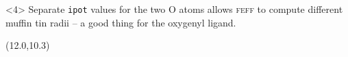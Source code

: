 \documentclass[10pt, xcolor=x11names, compress]{beamer}
\begin{document}
\begin{frame}[fragile]
\begin{columns}[T]
\begin{column}{0.5\linewidth}
{\begin{exampleblock}{}
          \AtomsListSites
        \end{exampleblock}
      }
    \end{column}
  \end{columns}
  \begin{block}<4>{}%
    Separate \texttt{ipot} values for the two O atoms allows
    \textsc{feff} to compute different muffin tin radii -- a good
    thing for the oxygenyl ligand.
  \end{block}
  \begin{textblock*}{0.33\linewidth}(12.0\TPHorizModule,10.3\TPVertModule)%
  \end{textblock*}
\end{frame}
\end{document}
